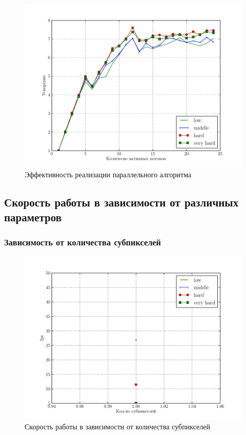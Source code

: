 \documentclass[12pt, a4paper, utf8]{article}
\begin{document}
\begin{figure}[H]
\centering
\includegraphics[width=\textwidth]{perf/table_perf_eff.pdf}
\caption{Эффективность реализации параллельного алгоритма}\label{fig:eff_parallel_alg}
\end{figure}


\subsection{Скорость работы в зависимости от различных параметров}

\subsubsection{Зависимость от количества субпикселей}



\begin{figure}[H]
\centering
\includegraphics[width=\textwidth]{perf/performance_aa.pdf}
\caption{Скорость работы в зависимости от количества субпикселей}\label{fig:performance_aa}
\end{figure}
\end{document}
